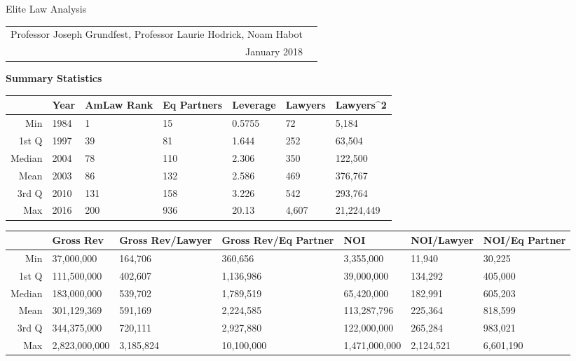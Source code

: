 \documentclass{article}
\begin{document}
\begin{center}{\LARGE Elite Law Analysis}
\\
\begin{tabular}{rl}\\Professor Joseph Grundfest, Professor Laurie Hodrick, Noam Habot \\January 2018\end{tabular}\end{center}
{\large \textbf{Summary Statistics} }
\begin{table}[H]
\centering
\begin{tabular}{rllllll}
  \hline
 & Year & AmLaw Rank & Eq Partners & Leverage & Lawyers & Lawyers^2 \\ 
  \hline
Min & 1984 & 1 & 15 & 0.5755 & 72 & 5,184 \\ 
  1st Q & 1997 & 39 & 81 & 1.644 & 252 & 63,504 \\ 
  Median & 2004 & 78 & 110 & 2.306 & 350 & 122,500 \\ 
  Mean & 2003 & 86 & 132 & 2.586 & 469 & 376,767 \\ 
  3rd Q & 2010 & 131 & 158 & 3.226 & 542 & 293,764 \\ 
  Max & 2016 & 200 & 936 & 20.13 & 4,607 & 21,224,449 \\ 
   \hline
\end{tabular}
\end{table}
\begin{table}[H]
\centering
\begin{tabular}{rllllll}
  \hline
 & Gross Rev & Gross Rev/Lawyer & Gross Rev/Eq Partner & NOI & NOI/Lawyer & NOI/Eq Partner \\ 
  \hline
Min & 37,000,000 & 164,706 & 360,656 & 3,355,000 & 11,940 & 30,225 \\ 
  1st Q & 111,500,000 & 402,607 & 1,136,986 & 39,000,000 & 134,292 & 405,000 \\ 
  Median & 183,000,000 & 539,702 & 1,789,519 & 65,420,000 & 182,991 & 605,203 \\ 
  Mean & 301,129,369 & 591,169 & 2,224,585 & 113,287,796 & 225,364 & 818,599 \\ 
  3rd Q & 344,375,000 & 720,111 & 2,927,880 & 122,000,000 & 265,284 & 983,021 \\ 
  Max & 2,823,000,000 & 3,185,824 & 10,100,000 & 1,471,000,000 & 2,124,521 & 6,601,190 \\ 
   \hline
\end{tabular}
\end{table}
\end{document}
